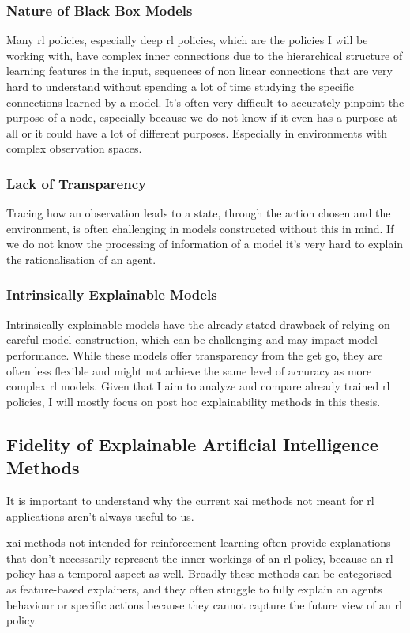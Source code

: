 \documentclass[UKenglish]{uiomasterthesis}
\begin{document}
\subsubsection{Nature of Black Box Models}
Many \ac{rl} policies, especially deep \ac{rl} policies, which are the policies I will be working with, have complex inner connections due to the hierarchical structure of learning features in the input, sequences of non linear connections that are very hard to understand without spending a lot of time studying the specific connections learned by a model. It's often very difficult to accurately pinpoint the purpose of a node, especially because we do not know if it even has a purpose at all or it could have a lot of different purposes. Especially in environments with complex observation spaces.


\subsubsection{Lack of Transparency}
Tracing how an observation leads to a state, through the action chosen and the environment, is often challenging in models constructed without this in mind. If we do not know the processing of information of a model it's very hard to explain the rationalisation of an agent.

\subsubsection{Intrinsically Explainable Models}
Intrinsically explainable models have the already stated drawback of relying on careful model construction, which can be challenging and may impact model performance. While these models offer transparency from the get go, they are often less flexible and might not achieve the same level of accuracy as more complex \ac{rl} models. Given that I aim to analyze and compare already trained \ac{rl} policies, I will mostly focus on post hoc explainability methods in this thesis.



\subsection{Fidelity of Explainable Artificial Intelligence Methods}
It is important to understand why the current \ac{xai} methods not meant for \ac{rl} applications aren't always useful to us.

\ac{xai} methods not intended for reinforcement learning often provide explanations that don't necessarily represent the inner workings of an \ac{rl} policy, because an \ac{rl} policy has a temporal aspect as well. Broadly these methods can be categorised as feature-based explainers, and they often struggle to fully explain an agents behaviour or specific actions because they cannot capture the future view of an \ac{rl} policy. 
\end{document}
